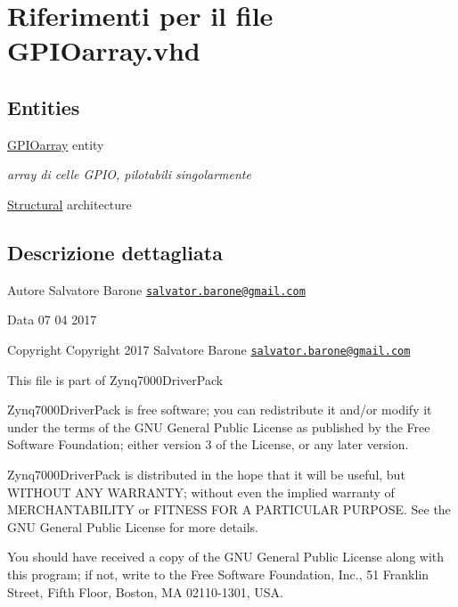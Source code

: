 \hypertarget{_g_p_i_oarray_8vhd}{\section{Riferimenti per il file G\+P\+I\+Oarray.\+vhd}
\label{_g_p_i_oarray_8vhd}
}
\subsection*{Entities}
\begin{DoxyCompactItemize}
\item 
\hyperlink{class_g_p_i_oarray}{G\+P\+I\+Oarray} entity
\begin{DoxyCompactList}\small\item\em array di celle G\+P\+I\+O, pilotabili singolarmente \end{DoxyCompactList}\item 
\hyperlink{class_g_p_i_oarray_1_1_structural}{Structural} architecture
\end{DoxyCompactItemize}


\subsection{Descrizione dettagliata}
\begin{DoxyAuthor}{Autore}
Salvatore Barone \href{mailto:salvator.barone@gmail.com}{\tt salvator.\+barone@gmail.\+com} 
\end{DoxyAuthor}
\begin{DoxyDate}{Data}
07 04 2017
\end{DoxyDate}
\begin{DoxyCopyright}{Copyright}
Copyright 2017 Salvatore Barone \href{mailto:salvator.barone@gmail.com}{\tt salvator.\+barone@gmail.\+com}
\end{DoxyCopyright}
This file is part of Zynq7000\+Driver\+Pack

Zynq7000\+Driver\+Pack is free software; you can redistribute it and/or modify it under the terms of the G\+N\+U General Public License as published by the Free Software Foundation; either version 3 of the License, or any later version.

Zynq7000\+Driver\+Pack is distributed in the hope that it will be useful, but W\+I\+T\+H\+O\+U\+T A\+N\+Y W\+A\+R\+R\+A\+N\+T\+Y; without even the implied warranty of M\+E\+R\+C\+H\+A\+N\+T\+A\+B\+I\+L\+I\+T\+Y or F\+I\+T\+N\+E\+S\+S F\+O\+R A P\+A\+R\+T\+I\+C\+U\+L\+A\+R P\+U\+R\+P\+O\+S\+E. See the G\+N\+U General Public License for more details.

You should have received a copy of the G\+N\+U General Public License along with this program; if not, write to the Free Software Foundation, Inc., 51 Franklin Street, Fifth Floor, Boston, M\+A 02110-\/1301, U\+S\+A. 